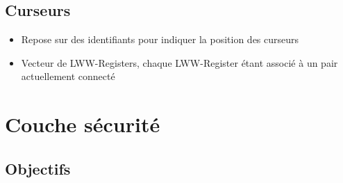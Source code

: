 \documentclass[12pt]{thesul}
\begin{document}
\subsection{Curseurs}

\begin{itemize}
  \item Repose sur des identifiants pour indiquer la position des curseurs
  \item Vecteur de LWW-Registers, chaque LWW-Register étant associé à un pair actuellement connecté
\end{itemize}






\section{Couche sécurité}

\subsection{Objectifs}
\end{document}
